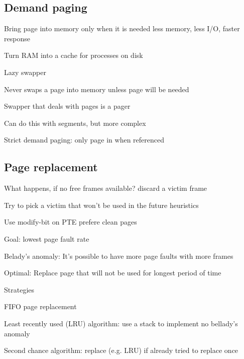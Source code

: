 \subsection{Demand paging}
\enumstart
	\item Bring page into memory only when it is needed \arrow less memory, less I/O, faster response
	\item Turn RAM into a cache for processes on disk
	\item Lazy swapper
	\enumstart
		\item Never swaps a page into memory unless page will be needed
		\item Swapper that deals with pages is a pager
		\item Can do this with segments, but more complex
	\enumend
	\item Strict demand paging: only page in when referenced
\enumend

\subsection{Page replacement}
\enumstart
	\item What happens, if no free frames available? \arrow discard a victim frame
	\item Try to pick a victim that won't be used in the future \arrow heuristics
	\item Use modify-bit on PTE \arrow prefere clean pages
	\item Goal: lowest page fault rate
	\item Belady's anomaly: It's possible to have more page faults with more frames
	\item Optimal: Replace page that will not be used for longest period of time
	\item Strategies
	\enumstart
		\item FIFO page replacement
		\item Least recently used (LRU) algorithm: use a stack to implement \arrow no bellady's anomaly
		\item Second chance algorithm: replace (e.g. LRU) if already tried to replace once
	\enumend
\enumend

